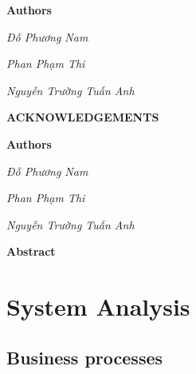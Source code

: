 \documentclass[12pt,a4paper]{report}
\theoremstyle{definition}
\begin{document}
\par\hfill\textbf{Authors}\hspace{1cm}
\par\hfill\textit{Đỗ Phương Nam}
\par\hfill\textit{Phan Phạm Thi}\hspace{0.3cm}
\par\hfill\textit{Nguyễn Trường Tuấn Anh}\hspace{0.2cm}
\newpage

\begin{center}
    \textbf{\Large ACKNOWLEDGEMENTS}
\end{center}

\par\hfill\textbf{Authors}\hspace{1cm}
\par\hfill\textit{Đỗ Phương Nam}
\par\hfill\textit{Phan Phạm Thi}\hspace{0.3cm}
\par\hfill\textit{Nguyễn Trường Tuấn Anh}\hspace{0.2cm}
\newpage

\begin{center}
    \textbf{\Large Abstract}
\end{center}
\newpage

\begin{singlespace}
\tableofcontents
\end{singlespace}
\newpage

\begin{singlespace}
\listoffigures
\end{singlespace}
\newpage

\begin{singlespace}
\listoftables
\end{singlespace}
\newpage



\newpage

\newpage


\newpage


\newpage





\section{System Analysis}
\subsection{Business processes}
\end{document}
